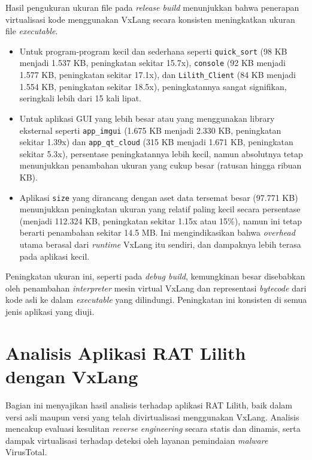 Hasil pengukuran ukuran file pada \textit{release build} menunjukkan bahwa penerapan virtualisasi kode menggunakan VxLang secara konsisten meningkatkan ukuran file \textit{executable}.
\begin{itemize}
    \item Untuk program-program kecil dan sederhana seperti \texttt{quick\_sort} (98 KB menjadi 1.537 KB, peningkatan sekitar 15.7x), \texttt{console} (92 KB menjadi 1.577 KB, peningkatan sekitar 17.1x), dan \texttt{Lilith\_Client} (84 KB menjadi 1.554 KB, peningkatan sekitar 18.5x), peningkatannya sangat signifikan, seringkali lebih dari 15 kali lipat.
    \item Untuk aplikasi GUI yang lebih besar atau yang menggunakan library eksternal seperti \texttt{app\_imgui} (1.675 KB menjadi 2.330 KB, peningkatan sekitar 1.39x) dan \texttt{app\_qt\_cloud} (315 KB menjadi 1.671 KB, peningkatan sekitar 5.3x), persentase peningkatannya lebih kecil, namun absolutnya tetap menunjukkan penambahan ukuran yang cukup besar (ratusan hingga ribuan KB).
    \item Aplikasi \texttt{size} yang dirancang dengan aset data tersemat besar (97.771 KB) menunjukkan peningkatan ukuran yang relatif paling kecil secara persentase (menjadi 112.324 KB, peningkatan sekitar 1.15x atau 15\%), namun ini tetap berarti penambahan sekitar 14.5 MB. Ini mengindikasikan bahwa \textit{overhead} utama berasal dari \textit{runtime} VxLang itu sendiri, dan dampaknya lebih terasa pada aplikasi kecil.
\end{itemize}
Peningkatan ukuran ini, seperti pada \textit{debug build}, kemungkinan besar disebabkan oleh penambahan \textit{interpreter} mesin virtual VxLang dan representasi \textit{bytecode} dari kode asli ke dalam \textit{executable} yang dilindungi. Peningkatan ini konsisten di semua jenis aplikasi yang diuji.

\section{Analisis Aplikasi RAT Lilith dengan VxLang}
\label{bab:hasil_penelitian_lilith} %
Bagian ini menyajikan hasil analisis terhadap aplikasi RAT Lilith, baik dalam versi asli maupun versi yang telah divirtualisasi menggunakan VxLang. Analisis mencakup evaluasi kesulitan \textit{reverse engineering} secara statis dan dinamis, serta dampak virtualisasi terhadap deteksi oleh layanan pemindaian \textit{malware} VirusTotal.

